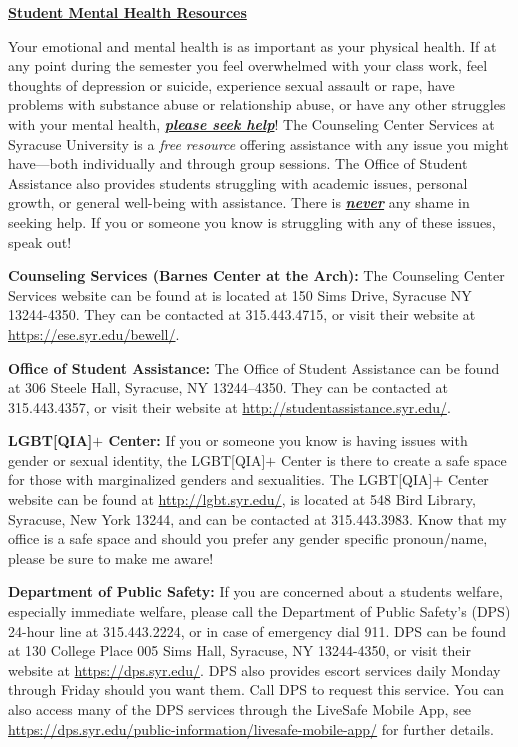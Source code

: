 \documentclass[11pt,a4paper]{article}
\newcommand{\pspace}{\par\vspace{\baselineskip}}
\begin{document}
\begin{center}{\LARGE\bfseries\underline{Student Mental Health Resources}}\end{center}


\noindent Your emotional and mental health is as important as your physical health. If at any point during the semester you feel overwhelmed with your class work, feel thoughts of depression or suicide, experience sexual assault or rape, have problems with substance abuse or relationship abuse, or have any other struggles with your mental health, \emph{\textbf{\underline{please seek help}}}! The Counseling Center Services at Syracuse University is a \emph{free resource} offering assistance with any issue you might have---both individually and through group sessions. The Office of Student Assistance also provides students struggling with academic issues, personal growth, or general well-being with assistance. There is \emph{\underline{\textbf{never}}} any shame in seeking help. If you or someone you know is struggling with any of these issues, speak out! \pspace


\noindent\textbf{Counseling Services (Barnes Center at the Arch):} The Counseling Center Services website can be found at is located at 150 Sims Drive, Syracuse NY 13244-4350. They can be contacted at 315.443.4715, or visit their website at \url{https://ese.syr.edu/bewell/}. \pspace


\noindent\textbf{Office of Student Assistance:} The Office of Student Assistance can be found at 306 Steele Hall, Syracuse, NY 13244--4350. They can be contacted at 315.443.4357, or visit their website at \url{http://studentassistance.syr.edu/}. \pspace


\noindent\textbf{LGBT[QIA]$+$ Center:} If you or someone you know is having issues with gender or sexual identity, the LGBT[QIA]$+$ Center is there to create a safe space for those with marginalized genders and sexualities. The LGBT[QIA]$+$ Center website can be found at \url{http://lgbt.syr.edu/}, is located at 548 Bird Library, Syracuse, New York 13244, and can be contacted at 315.443.3983. Know that my office is a safe space and should you prefer any gender specific pronoun/name, please be sure to make me aware! \pspace


\noindent\textbf{Department of Public Safety:} If you are concerned about a students welfare, especially immediate welfare, please call the Department of Public Safety's (DPS) 24-hour line at 315.443.2224, or in case of emergency dial 911. DPS can be found at 130 College Place 005 Sims Hall, Syracuse, NY 13244-4350, or visit their website at \url{https://dps.syr.edu/}. DPS also provides escort services daily Monday through Friday should you want them. Call DPS to request this service. You can also access many of the DPS services through the LiveSafe Mobile App, see \url{https://dps.syr.edu/public-information/livesafe-mobile-app/} for further details. \pspace
\end{document}
